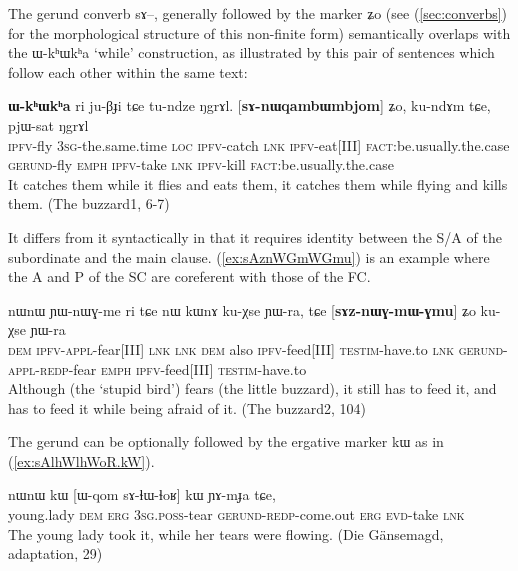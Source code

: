\documentclass[oldfontcommands,oneside,a4paper,11pt]{article}
\newcommand{\ipa}[1]{{\phon \mbox{#1}}} %
\newcommand{\refb}[1]{(\ref{#1})}
\begin{document}
The gerund converb \ipa{sɤ}--, generally followed by the marker \ipa{ʑo} (see \refb{sec:converbs} for the morphological structure of this non-finite form)   semantically overlaps with the \ipa{ɯ-kʰɯkʰa} `while' construction, as illustrated by this pair of sentences which follow each other within the same text:

\begin{exe}
\ex \label{ex:sanWqambWmbjom}
\gll [\ipa{ɲɯ-nɯqambɯmbjom}]  \textbf{	\ipa{ɯ-kʰɯkʰa}}  	\ipa{ri}  	\ipa{ju-βɟi}  	\ipa{tɕe}  	\ipa{tu-ndze}  	\ipa{ŋgrɤl.}  	[\textbf{\ipa{sɤ-nɯqambɯmbjom}}]  	\ipa{ʑo,}  	\ipa{ku-ndɤm}  	\ipa{tɕe,}  	\ipa{pjɯ-sat}  	\ipa{ŋgrɤl}  \\
\textsc{ipfv}-fly \textsc{3sg}-the.same.time \textsc{loc} \textsc{ipfv}-catch \textsc{lnk} \textsc{ipfv}-eat[III] \textsc{fact}:be.usually.the.case 
\textsc{gerund}-fly \textsc{emph}
\textsc{ipfv}-take \textsc{lnk} \textsc{ipfv}-kill \textsc{fact}:be.usually.the.case 
\\
\glt It catches them while it flies and eats them, it catches them while flying and kills them. (The buzzard1, 6-7)
\end{exe} 

It differs from it syntactically in that it requires identity between the   S/A of the subordinate and the main clause. \refb{ex:sAznWGmWGmu} is an example where the A and P of the SC are coreferent with those of the FC.

\begin{exe}
\ex \label{ex:sAznWGmWGmu}
\gll
 	\ipa{nɯnɯ}  	\ipa{ɲɯ-nɯɣ-me}  	\ipa{ri} \ipa{tɕe} 	\ipa{nɯ}  	\ipa{kɯnɤ}  	\ipa{ku-χse}  	\ipa{ɲɯ-ra,}  	\ipa{tɕe}  	[\textbf{\ipa{sɤz-nɯɣ-mɯ-ɣmu}}]  	\ipa{ʑo}  	\ipa{ku-χse}  	\ipa{ɲɯ-ra}  \\
 	\textsc{dem} \textsc{ipfv-appl}-fear[III] \textsc{lnk}  \textsc{lnk} \textsc{dem} also \textsc{ipfv}-feed[III] \textsc{testim}-have.to \textsc{lnk} \textsc{gerund-appl-redp}-fear \textsc{emph} \textsc{ipfv}-feed[III] \textsc{testim}-have.to \\
 	\glt Although (the `stupid bird') fears (the little buzzard), it still has to feed it, and has to feed it while being afraid of it. (The buzzard2, 104)
\end{exe}

The gerund can be optionally followed by the ergative marker \ipa{kɯ} as in \refb{ex:sAlhWlhWoR.kW}.

\begin{exe}
\ex \label{ex:sAlhWlhWoR.kW}
\gll \ipa{tɤʑi} 	\ipa{nɯnɯ} 	\ipa{kɯ} 	[\ipa{ɯ-qom} 	\ipa{sɤ-ɬɯ-ɬoʁ}] 	\ipa{kɯ} 	\ipa{ɲɤ-mɟa} 	\ipa{tɕe,} \\
young.lady \textsc{dem} \textsc{erg} \textsc{3sg.poss}-tear \textsc{gerund-redp}-come.out \textsc{erg} \textsc{evd}-take \textsc{lnk} \\
\glt The young lady took it, while her tears were flowing. (Die Gänsemagd, adaptation, 29)
\end{exe}
\end{document}
